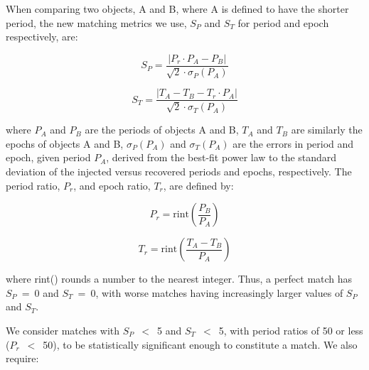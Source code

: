 When comparing two objects, A and B, where A is defined to have the shorter period, the new matching metrics we use, $S_{P}$ and $S_{T}$ for period and epoch respectively, are:

\begin{equation}
    S_{P} = \frac{\left|P_{r} \cdot P_{A} - P_{B}\right|}{\sqrt{2}\cdot\sigma_{P}(P_{A})}
\end{equation}

\begin{equation}
    S_{T} = \frac{\left| T_{A} - T_{B} - T_{r} \cdot P_{A}\right|}{\sqrt{2}\cdot\sigma_{T}(P_{A})}
\end{equation}

\noindent where $P_{A}$ and $P_{B}$ are the periods of objects A and B, $T_{A}$ and $T_{B}$ are similarly the epochs of objects A and B, $\sigma_{P}(P_{A})$ and $\sigma_{T}(P_{A})$ are the errors in period and epoch, given period $P_{A}$, derived from the best-fit power law to the standard deviation of the injected versus recovered periods and epochs, respectively. The period ratio, $P_{r}$, and epoch ratio, $T_{r}$, are defined by:

\begin{equation}
P_{r} = \textrm{rint}\left(\frac{P_{B}}{P_{A}}\right)
\end{equation}

\begin{equation}
T_{r} = \textrm{rint}\left(\frac{T_{A} - T_{B}}{P_{A}}\right)
\end{equation}


\noindent where rint() rounds a number to the nearest integer. Thus, a perfect match has $S_{P}$~=~0 and  $S_{T}$~=~0, with worse matches having increasingly larger values of $S_{P}$ and $S_{T}$. 

We consider matches with $S_{P}$~$<$~5 and $S_{T}$~$<$~5, with period ratios of 50 or less ($P_{r}$~$<$~50), to be statistically significant enough to constitute a match. We also require:


